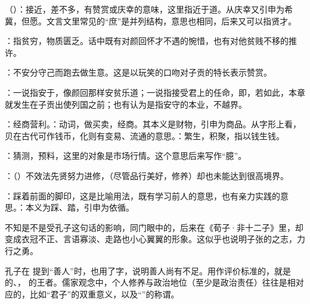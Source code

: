 {
\item {}（）：接近，差不多，有赞赏或庆幸的意味，这里指近于道。从庆幸又引申为希冀，但愿。文言文里常见的“庶”是并列结构，意思也相同，后来又可以指贤才。
\item {}：指贫穷，物质匮乏。话中既有对颜回怀才不遇的惋惜，也有对他贫贱不移的推许。
\item {}：不安分守己而跑去做生意。这是以玩笑的口吻对子贡的特长表示赞赏。

：一说指安于，像颜回那样安贫乐道；一说指接受君上的任命，即，若如此，本章就发生在子贡出使列国之前；也有认为是指安守的本业，不越界。

：经商营利。：动词，做买卖，经商。其本义是财物，引申为商品。从字形上看，贝在古代可作钱币，化则有变易、流通的意思。：繁生，积聚，指以钱生钱。
\item {}：猜测，预料，这里的对象是市场行情。这个意思后来写作“臆”。
}
{}


{
\begin{lyblobitemize}
\item {}：（）不效法先贤努力进修，（尽管品行美好，修养）却也未能达到很高境界。

：踩着前面的脚印，这是比喻用法，既有学习前人的意思，也有亲力实践的意思。：本义为踩、踏，引申为依循。

不知是不是受孔子这句话的影响，同门眼中的，后来在《荀子·非十二子》里，却变成衣冠不正、言语寡淡、走路也小心翼翼的形象。这似乎也说明子张的之志，力行之勇。
\end{lyblobitemize}
孔子在   提到“善人”时，也用了字，说明善人尚有不足。用作评价标准的，就是  的、， 的王者。儒家观念中，个人修养与政治地位（至少是政治责任）往往是相对应的，比如“君子”的双重意义，以及“”的称谓。
}
{}


